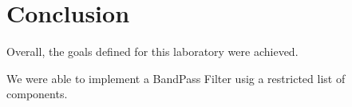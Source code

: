 \section{Conclusion}
\label{sec:conclusion}


Overall, the goals defined for this laboratory were achieved.

We were able to implement a BandPass Filter usig a restricted list of components.   
